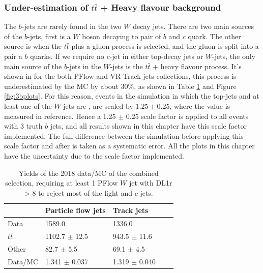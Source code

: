 \documentclass[letterpaper,12pt]{article}
\begin{document}
\subsubsection{Under-estimation of $t\bar{t}$ + Heavy flavour background }
The $b$-jets are rarely found in the two $W$ decay jets. There are two main sources of 
the $b$-jets, first is a $W$ boson decaying to pair of $b$ and $c$ quark. The other 
source is when the $t\bar{t}$ plus a gluon process is selected, and the gluon is split 
into a pair a $b$ quarks. If we require no $c$-jet in either top-decay jets or $W$-jets, 
the only main source of the $b$-jets in the $W$-jets is the $t\bar{t}$ + heavy flavour 
process. It's shown in for the both PFlow and VR-Track jets collections, this process is 
underestimated by the MC by about 30\%, as shown in Table \ref{tab:3byields1} 
and Figure \ref{fig:3bplots}. For this reason, events in the simulation
in which the top-jets and at least one of the $W$-jets are \bjets, are
scaled by $1.25 \pm 0.25$, where the value is measured in reference\cite{TOPQ-2017-12}.
Hence a 1.25 $\pm$ 0.25 scale factor is applied to all events with 3 truth $b$ jets, 
and all results shown in this chapter have this scale factor implemented. 
The full difference between the simulation before applying this scale factor and 
after is taken as a systematic error. All the plots in this chapter have the 
uncertainty due to the scale factor implemented. 




\begin{table}[]
    \centering
	\begin{tabular}{|l|ll|ll|}
		\hline
		& Particle flow jets & Track jets \\
		\hline
        Data & 1589.0 &  1336.0 \\
         $t\bar{t}$ & 1102.7 $\pm$ 12.5  & 943.5 $\pm$ 11.6 \\
         Other & 82.7 $\pm$ 5.5 &   69.1 $\pm$ 4.5 \\
		 Data/MC & 1.341 $\pm$ 0.037 &  1.319 $\pm$ 0.040 \\
		 \hline
    \end{tabular}
	\caption{Yields of the 2018 data/MC of the combined selection, 
	requiring at least 1 PFlow $W$ jet with DL1r > 8 to 
	reject most of the light and $c$ jets.}
    \label{tab:3byields1}
\end{table}
\end{document}
